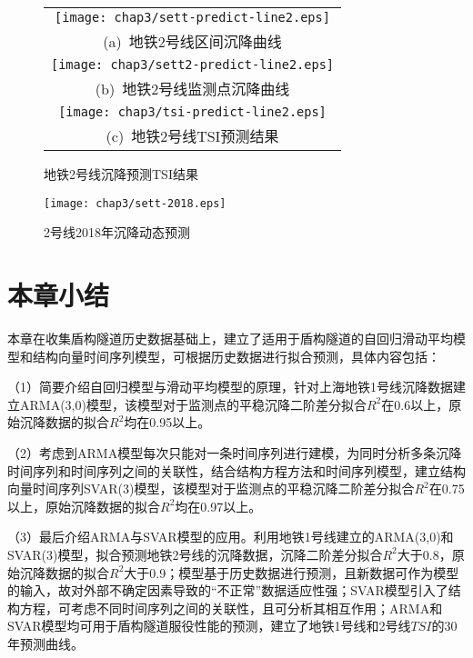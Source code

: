 \begin{figure}[htbp] 
    \centering 
    \begin{tabular}{c} 
        \texttt{[image: chap3/sett-predict-line2.eps]} \\ 
        (a)~地铁2号线区间沉降曲线 \\
        \texttt{[image: chap3/sett2-predict-line2.eps]} \\ 
        (b)~地铁2号线监测点沉降曲线 \\
        \texttt{[image: chap3/tsi-predict-line2.eps]} \\ 
        (c)~地铁2号线TSI预测结果 \\
    \end{tabular}
    \caption{地铁2号线沉降预测TSI结果} 
    \label{fig:地铁2号线沉降预测TSI结果} 
\end{figure}

\begin{figure}[htb!]
    \centering
    \texttt{[image: chap3/sett-2018.eps]}
    \caption{2号线2018年沉降动态预测}
    \label{fig:2号线2018年沉降动态预测}
\end{figure}

\section{本章小结}

本章在收集盾构隧道历史数据基础上，建立了适用于盾构隧道的自回归滑动平均模型和结构向量时间序列模型，可根据历史数据进行拟合预测，具体内容包括：

（1）简要介绍自回归模型与滑动平均模型的原理，针对上海地铁1号线沉降数据建立ARMA(3,0)模型，该模型对于监测点的平稳沉降二阶差分拟合$R^2$在0.6以上，原始沉降数据的拟合$R^2$均在0.95以上。

（2）考虑到ARMA模型每次只能对一条时间序列进行建模，为同时分析多条沉降时间序列和时间序列之间的关联性，结合结构方程方法和时间序列模型，建立结构向量时间序列SVAR(3)模型，该模型对于监测点的平稳沉降二阶差分拟合$R^2$在0.75以上，原始沉降数据的拟合$R^2$均在0.97以上。

（3）最后介绍ARMA与SVAR模型的应用。利用地铁1号线建立的ARMA(3,0)和SVAR(3)模型，拟合预测地铁2号线的沉降数据，沉降二阶差分拟合$R^2$大于0.8，原始沉降数据的拟合$R^2$大于0.9；模型基于历史数据进行预测，且新数据可作为模型的输入，故对外部不确定因素导致的“不正常”数据适应性强；SVAR模型引入了结构方程，可考虑不同时间序列之间的关联性，且可分析其相互作用；ARMA和SVAR模型均可用于盾构隧道服役性能的预测，建立了地铁1号线和2号线$TSI$的30年预测曲线。

